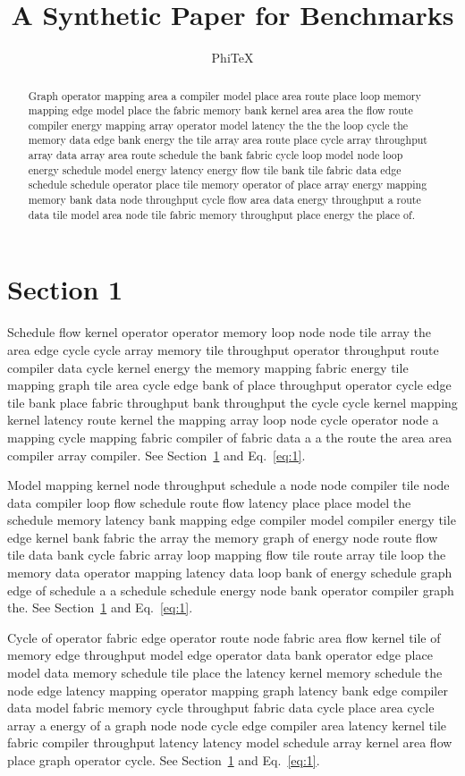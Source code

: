 \documentclass[10pt,twocolumn]{article}
\title{A Synthetic Paper for Benchmarks}
\author{PhiTeX}
\begin{document}
\maketitle
\begin{abstract}
Graph operator mapping area a compiler model place area route place loop memory mapping edge model place the fabric memory bank kernel area area the flow route compiler energy mapping array operator model latency the the the loop cycle the memory data edge bank energy the tile array area route place cycle array throughput array data array area route schedule the bank fabric cycle loop model node loop energy schedule model energy latency energy flow tile bank tile fabric data edge schedule schedule operator place tile memory operator of place array energy mapping memory bank data node throughput cycle flow area data energy throughput a route data tile model area node tile fabric memory throughput place energy the place of.
\end{abstract}
\section{Section 1}\label{sec:1}
Schedule flow kernel operator operator memory loop node node tile array the area edge cycle cycle array memory tile throughput operator throughput route compiler data cycle kernel energy the memory mapping fabric energy tile mapping graph tile area cycle edge bank of place throughput operator cycle edge tile bank place fabric throughput bank throughput the cycle cycle kernel mapping kernel latency route kernel the mapping array loop node cycle operator node a mapping cycle mapping fabric compiler of fabric data a a the route the area area compiler array compiler. See Section~\ref{sec:1} and Eq.~\eqref{eq:1}.

Model mapping kernel node throughput schedule a node node compiler tile node data compiler loop flow schedule route flow latency place place model the schedule memory latency bank mapping edge compiler model compiler energy tile edge kernel bank fabric the array the memory graph of energy node route flow tile data bank cycle fabric array loop mapping flow tile route array tile loop the memory data operator mapping latency data loop bank of energy schedule graph edge of schedule a a schedule schedule energy node bank operator compiler graph the. See Section~\ref{sec:1} and Eq.~\eqref{eq:1}.

Cycle of operator fabric edge operator route node fabric area flow kernel tile of memory edge throughput model edge operator data bank operator edge place model data memory schedule tile place the latency kernel memory schedule the node edge latency mapping operator mapping graph latency bank edge compiler data model fabric memory cycle throughput fabric data cycle place area cycle array a energy of a graph node node cycle edge compiler area latency kernel tile fabric compiler throughput latency latency model schedule array kernel area flow place graph operator cycle. See Section~\ref{sec:1} and Eq.~\eqref{eq:1}.
\end{document}
